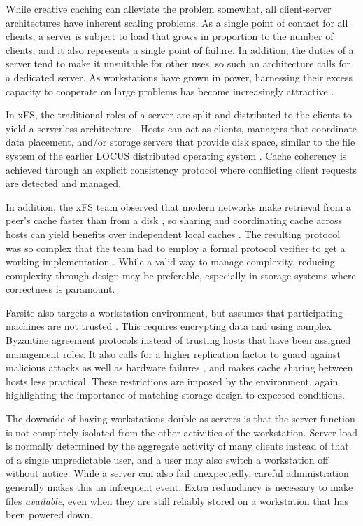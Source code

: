 While creative caching can alleviate the problem somewhat, all client-server architectures have inherent scaling problems. As a single point of contact for all clients, a server is subject to load that grows in proportion to the number of clients, and it also represents a single point of failure. In addition, the duties of a server tend to make it unsuitable for other uses, so such an architecture calls for a dedicated server. As workstations have grown in power, harnessing their excess capacity to cooperate on large problems has become increasingly attractive \cite{anderson95a}.

In xFS, the traditional roles of a server are split and distributed to the clients to yield a serverless architecture \cite{anderson95b}. Hosts can act as clients, managers that coordinate data placement, and/or storage servers that provide disk space, similar to the file system of the earlier LOCUS distributed operating system \cite{walker}. Cache coherency is achieved through an explicit consistency protocol where conflicting client requests are detected and managed.

In addition, the xFS team observed that modern networks make retrieval from a peer's cache faster than from a disk \cite{dahlin94b}, so sharing and coordinating cache across hosts can yield benefits over independent local caches \cite{dahlin94a}. The resulting protocol was so complex that the team had to employ a formal protocol verifier to get a working implementation \cite{wang98}. While a valid way to manage complexity, reducing complexity through design may be preferable, especially in storage systems where correctness is paramount.

Farsite also targets a workstation environment, but assumes that participating machines are not trusted \cite{adya}. This requires encrypting data and using complex Byzantine agreement protocols instead of trusting hosts that have been assigned management roles. It also calls for a higher replication factor to guard against malicious attacks as well as hardware failures \cite{dahlin94a}, and makes cache sharing between hosts less practical. These restrictions are imposed by the environment, again highlighting the importance of matching storage design to expected conditions.

The downside of having workstations double as servers is that the server function is not completely isolated from the other activities of the workstation. Server load is normally determined by the aggregate activity of many clients instead of that of a single unpredictable user, and a user may also switch a workstation off without notice. While a server can also fail unexpectedly, careful administration generally makes this an infrequent event. Extra redundancy is necessary to make files \emph{available}, even when they are still reliably stored on a workstation that has been powered down.

